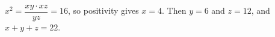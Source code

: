 $x^2=\dfrac{xy\cdot xz}{yz}=16$, so positivity gives $x=4$. Then $y=6$ and $z=12$, and $x+y+z=\boxed{22}$.
